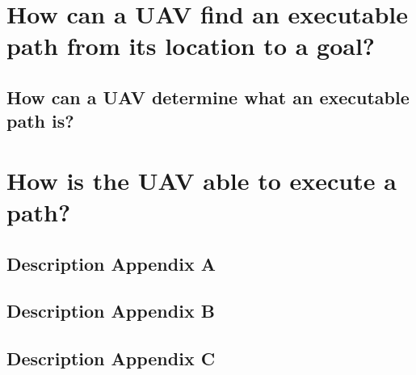 \documentclass[12pt,a4paper]{report}
\begin{document}
    \section{How can a UAV find an executable path from its location to a goal?}
      \subsection{How can a UAV determine what an executable path is?}
    \section{How is the UAV able to execute a path?}
  



  \renewcommand\thesubsection{\Alph{subsection}}  %
    \subsection{Description Appendix A}
    \subsection{Description Appendix B}
    \subsection{Description Appendix C}
\end{document}
